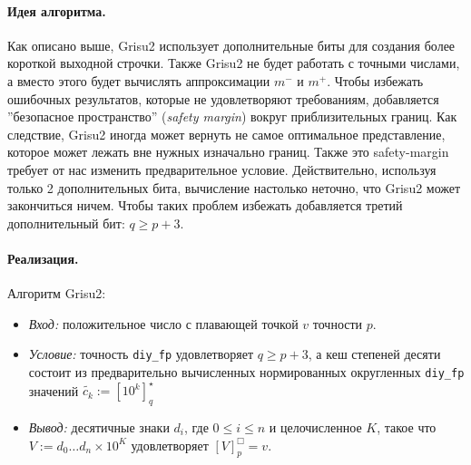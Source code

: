 \documentclass[a4paper, 12pt, twoside]{article}
\begin{document}
\paragraph{Идея алгоритма.} 
Как описано выше, \textsf{Grisu2} использует дополнительные биты для создания более короткой выходной строчки. 
Также \textsf{Grisu2} не будет работать с точными числами, а вместо этого будет вычислять аппроксимации $m^{-}$ и $m^+$. 
Чтобы избежать ошибочных результатов, которые не удовлетворяют требованиям, добавляется ''безопасное пространство'' (\textit{safety margin}) вокруг приблизительных границ. 
Как следствие, \textsf{Grisu2} иногда может вернуть не самое оптимальное представление, которое может лежать вне нужных изначально границ. 
Также это safety-margin требует от нас изменить предварительное условие. 
Действительно, используя только 2 дополнительных бита, вычисление настолько неточно, что \textsf{Grisu2} может закончиться ничем.
Чтобы таких проблем избежать добавляется третий дополнительный бит: $q \geqslant p + 3$.

\paragraph{Реализация.}
Алгоритм \textsf{Grisu2}: \begin{itemize}
\item \textit{Вход:} положительное число с плавающей точкой $v$ точности $p$.
\item \textit{Условие:} точность \texttt{diy\_fp} удовлетворяет $q \geqslant p + 3$, а кеш степеней десяти состоит из предварительно вычисленных нормированных округленных  \texttt{diy\_fp} значений $\tilde{c_k} := \left[ 10^k \right]_q^{\star}$
\item \textit{Вывод:} десятичные знаки $d_i$, где $0 \leqslant i \leqslant n$ и целочисленное $K$, такое что $V:=d_0\dots d_n \times 10 ^K$ удовлетворяет $[V]^{\Box}_p = v$. 
\end{itemize}
\end{document}
